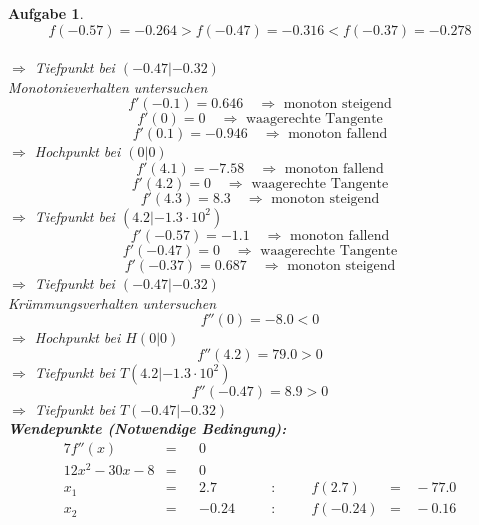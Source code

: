 \documentclass[12pt]{article}
\theoremstyle{note}
\newtheorem{aufgabe}{Aufgabe}
\begin{document}
\begin{flushleft}
\begin{aufgabe}
\vspace{1em}$$f(-0.57)=-0.264  >  f(-0.47)=-0.316  <   f(-0.37)=-0.278$$\\ 
$\Rightarrow$ Tiefpunkt bei $(-0.47|-0.32)$ \\ 
\vspace{1em}{\em 2. M\"oglichkeit:} Monotonieverhalten untersuchen \\ 
$$f'(-0.1)=0.646\quad \Rightarrow \text{ monoton steigend} $$$$f'(0)=0 \quad \Rightarrow \text{ waagerechte Tangente} $$$$f'(0.1)=-0.946\quad \Rightarrow \text{ monoton fallend} $$$\Rightarrow$ Hochpunkt bei $(0|0)$ \\ 
\vspace{1em}$$f'(4.1)=-7.58\quad \Rightarrow \text{ monoton fallend} $$$$f'(4.2)=0 \quad \Rightarrow \text{ waagerechte Tangente} $$$$f'(4.3)=8.3\quad \Rightarrow \text{ monoton steigend} $$$\Rightarrow$ Tiefpunkt bei $(4.2|-1.3 \cdot 10^{2})$ \\ 
\vspace{1em}$$f'(-0.57)=-1.1\quad \Rightarrow \text{ monoton fallend} $$$$f'(-0.47)=0 \quad \Rightarrow \text{ waagerechte Tangente} $$$$f'(-0.37)=0.687\quad \Rightarrow \text{ monoton steigend} $$$\Rightarrow$ Tiefpunkt bei $(-0.47|-0.32)$ \\ 
\vspace{1em}{\em 3. M\"oglichkeit:} Kr\"ummungsverhalten untersuchen \\ 
$$f''(0)=-8.0< 0 $$ 
$\Rightarrow$ Hochpunkt bei $H(0|0)$ \\ 
$$f''(4.2)=79.0> 0 $$ 
$\Rightarrow$ Tiefpunkt bei $T(4.2|-1.3 \cdot 10^{2})$ \\ 
$$f''(-0.47)=8.9> 0 $$ 
$\Rightarrow$ Tiefpunkt bei $T(-0.47|-0.32)$ \\ 
{\bf Wendepunkte (Notwendige Bedingung):} 
\begin{alignat*}{7} 
f''(x)&=& &0& \\ 
12 x^{2} - 30 x - 8&=& &0& \\ 
x_1&=& &2.7& \quad &:& \quad &f(2.7)&=& \,-77.0\\ 
x_2&=& &-0.24& \quad &:& \quad &f(-0.24)&=& \,-0.16\\ 
\end{alignat*} 

\end{aufgabe}\clearpage
\end{flushleft} 
\end{document}

